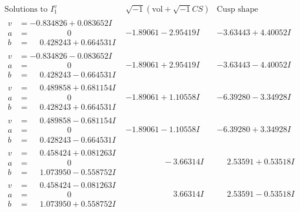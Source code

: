 \documentclass[1p]{elsarticle_modified}
\theoremstyle{definition}
\newcommand{\I}{\sqrt{-1}}
\begin{document}
$$\begin{array}{c|c|c}  
\text{Solutions to }I^v_{1}& \I (\text{vol} + \sqrt{-1}CS) & \text{Cusp shape}\\
 \hline 
\begin{aligned}
v &= -0.834826 + 0.083652 I \\
a &= \phantom{-0.000000 } 0 \\
b &= \phantom{-}0.428243 + 0.664531 I\end{aligned}
 & -1.89061 - 2.95419 I & -3.63443 + 4.40052 I \\ \hline\begin{aligned}
v &= -0.834826 - 0.083652 I \\
a &= \phantom{-0.000000 } 0 \\
b &= \phantom{-}0.428243 - 0.664531 I\end{aligned}
 & -1.89061 + 2.95419 I & -3.63443 - 4.40052 I \\ \hline\begin{aligned}
v &= \phantom{-}0.489858 + 0.681154 I \\
a &= \phantom{-0.000000 } 0 \\
b &= \phantom{-}0.428243 + 0.664531 I\end{aligned}
 & -1.89061 + 1.10558 I & -6.39280 - 3.34928 I \\ \hline\begin{aligned}
v &= \phantom{-}0.489858 - 0.681154 I \\
a &= \phantom{-0.000000 } 0 \\
b &= \phantom{-}0.428243 - 0.664531 I\end{aligned}
 & -1.89061 - 1.10558 I & -6.39280 + 3.34928 I \\ \hline\begin{aligned}
v &= \phantom{-}0.458424 + 0.081263 I \\
a &= \phantom{-0.000000 } 0 \\
b &= \phantom{-}1.073950 - 0.558752 I\end{aligned}
 & \phantom{-0.000000 } -3.66314 I & \phantom{-}2.53591 + 0.53518 I \\ \hline\begin{aligned}
v &= \phantom{-}0.458424 - 0.081263 I \\
a &= \phantom{-0.000000 } 0 \\
b &= \phantom{-}1.073950 + 0.558752 I\end{aligned}
 & \phantom{-0.000000 -}3.66314 I & \phantom{-}2.53591 - 0.53518 I \\ \hline\begin{aligned}

\end{aligned}
\end{array}$$
\end{document}
